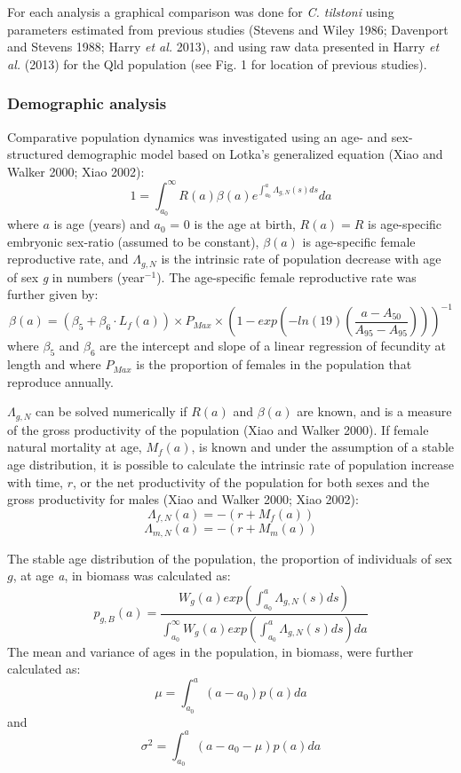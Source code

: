 \documentclass[]{article}
\begin{document}
For each analysis a graphical comparison was done for \emph{C. tilstoni}
using parameters estimated from previous studies (Stevens and Wiley
1986; Davenport and Stevens 1988; Harry \emph{et al.} 2013), and using
raw data presented in Harry \emph{et al.} (2013) for the Qld population
(see Fig. 1 for location of previous studies).

\hypertarget{demographic-analysis}{%
\subsubsection{Demographic analysis}\label{demographic-analysis}}

Comparative population dynamics was investigated using an age- and
sex-structured demographic model based on Lotka's generalized equation
(Xiao and Walker 2000; Xiao 2002):
\[1 = \int_{a_0}^{\infty}R(a)\beta(a)e^{\int_{a_0}^{a}\Lambda_{g, N}(s) ds}da\]
where \(a\) is age (years) and \(a_0\) = 0 is the age at birth,
\(R(a) = R\) is age-specific embryonic sex-ratio (assumed to be
constant), \(\beta(a)\) is age-specific female reproductive rate, and
\(\Lambda_{g, N}\) is the intrinsic rate of population decrease with age
of sex \emph{g} in numbers (year\(^{-1}\)). The age-specific female
reproductive rate was further given by:
\[\beta(a) = (\beta_5 + \beta_6 \cdot L_f(a)) \times P_{Max} \times (1 - exp( -ln(19)(\frac{a-A_{50}}{A_{95} - A_{95}})))^{-1}\]
where \(\beta_5\) and \(\beta_6\) are the intercept and slope of a
linear regression of fecundity at length and where \(P_{Max}\) is the
proportion of females in the population that reproduce annually.

\(\Lambda_{g,N}\) can be solved numerically if \(R(a)\) and \(\beta(a)\)
are known, and is a measure of the gross productivity of the population
(Xiao and Walker 2000). If female natural mortality at age, \(M_f(a)\),
is known and under the assumption of a stable age distribution, it is
possible to calculate the intrinsic rate of population increase with
time, \(r\), or the net productivity of the population for both sexes
and the gross productivity for males (Xiao and Walker 2000; Xiao 2002):
\[\Lambda_{f,N}(a) = -(r + M_f(a))\]
\[\Lambda_{m,N}(a) = -(r + M_m(a))\]

The stable age distribution of the population, the proportion of
individuals of sex \(g\), at age \emph{a}, in biomass was calculated as:
\[p_{g, B}(a) = \frac{W_{g}(a)exp(\int_{a_0}^{a}\Lambda_{g, N}(s) ds)}{\int_{a_0}^{\infty}W_{g}(a)exp(\int_{a_0}^{a}\Lambda_{g, N}(s) ds)da}\]
The mean and variance of ages in the population, in biomass, were
further calculated as: \[\mu = \int_{a_0}^{a}(a-a_0)p(a)da\] and
\[\sigma^2 = \int_{a_0}^{a}(a-a_0-\mu)p(a)da\]
\end{document}
